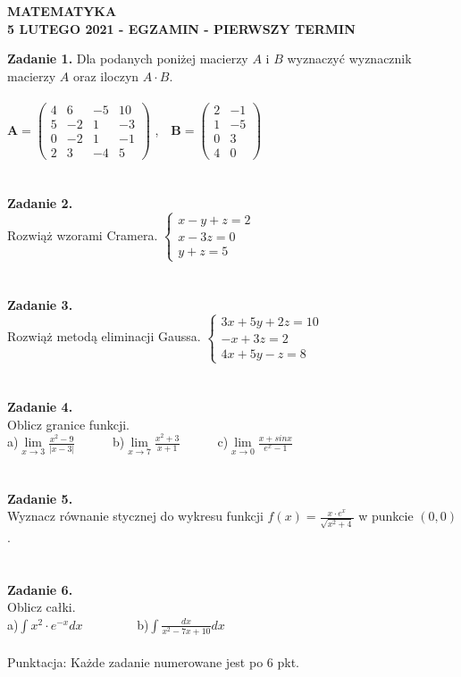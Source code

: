 \documentclass[12pt,a4paper]{report}
\begin{document}
\begin{center}

\textbf{MATEMATYKA \\5 LUTEGO 2021 - EGZAMIN - PIERWSZY TERMIN}

\end{center}\textbf{Zadanie 1.} Dla podanych poniżej macierzy $A$ i $B$ wyznaczyć wyznacznik macierzy $A$ oraz iloczyn $A\cdot B$. \\\\ $ \mathbf{A} = \left( \begin{array}{cccc} 4 & 6& -5 & 10\\5 & -2& 1 & -3\\0 & -2& 1 & -1\\2 & 3 & -4 & 5 \end{array} \right)$ ,\ \ $\mathbf{B} =\left( \begin{array}{cccc}2 & -1\\1 & -5\\0 & 3\\4 & 0  \end{array} \right)$\\\\\\\textbf{Zadanie 2.}  \\Rozwiąż wzorami Cramera. $\left\{ \begin{array}{ll}x-y+z=2\\x-3z=0\\y+z=5\end{array}\right.$\\\\\\\textbf{Zadanie 3.} \\Rozwiąż metodą eliminacji Gaussa. $\left\{ \begin{array}{ll}3x+5y+2z=10\\-x+3z=2\\4x+5y-z=8\end{array} \right.$\\\\\\\textbf{Zadanie 4.} \\Oblicz granice funkcji.\\a)$\lim\limits_{x\to 3}\frac{x^2-9}{\vert x-3\vert}$\ \ \ \ \ \  b)$\lim\limits_{x\to 7}\frac{x^2+3}{x+1}$\ \ \ \ \ \ c)$\lim\limits_{x\to 0} \frac{x+sinx}{e^x-1}$\\\\\\\textbf{Zadanie 5.} \\Wyznacz równanie stycznej do wykresu funkcji $f(x)=\frac{x\cdot e^x}{\sqrt{x^2+4}}$ w punkcie $(0,0)$.\\\\\\\textbf{Zadanie 6.} \\Oblicz całki. \\a)$\int x^2\cdot e^{-x} dx$ \ \ \ \ \ \ \ \ b)$\int \frac{dx}{x^2-7x+10} dx$\\\\Punktacja: Każde zadanie numerowane jest po 6 pkt.
\end{document}
